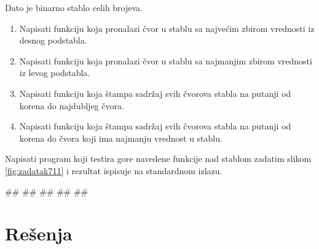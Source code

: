 \begin{Exercise}[label=711]
Dato je binarno stablo celih brojeva.
\begin{enumerate}
\item Napisati funkciju koja pronalazi čvor u stablu sa najvećim zbirom vrednosti iz desnog podstabla.
\item Napisati funkciju koja pronalazi čvor u stablu sa najmanjim zbirom vrednosti iz levog podstabla.
\item Napisati funkciju koja štampa sadržaj svih čvorova stabla na putanji od korena do najdubljeg čvora.
\item Napisati funkciju koja štampa sadržaj svih čvorova stabla na putanji od korena do čvora koji ima najmanju vrednost u stablu.
\end{enumerate}
Napisati program koji testira gore navedene funkcije nad stablom zadatim slikom \ref{fig:zadatak711} i rezultat ispisuje na standardnom izlazu.  

\begin{miditest}
\begin{test}{1}
#\naslovIzlaz#
##
##
##
##
\end{test}
\end{miditest}

\end{Exercise}

\begin{Answer}[ref=711]
\end{Answer}

\section{Rešenja}
\shipoutAnswer
